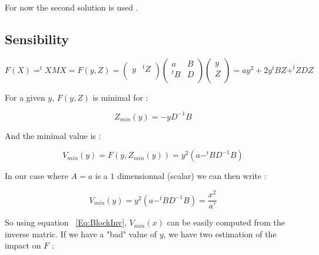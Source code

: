 For now the second solution is used .




\subsection{Sensibility}


\begin{equation}
F(X) = ^t X M X = F(y,Z)= 
\left( \begin{array}{cc} 
              y &  ^t Z \\ 
        \end{array} 
\right)
\left( \begin{array}{cc} 
              a & B \\ 
              ^t B  & D\\ 
        \end{array} 
\right)
\left( \begin{array}{c} 
              y \\ 
              Z \\ 
        \end{array} 
\right)
= a y^2 + 2y^t B Z + ^t Z D Z
\label{EqSensib1}
\end{equation}

For a given $y$, $F(y,Z)$ is minimal for :

\begin{equation}
Z_{min}(y) = -y  D^{-1} B
\end{equation}

And the minimal value is :

\begin{equation}
V_{min}(y) = F(y,Z_{min}(y)) =  y^2 (a- ^t B D^{-1} B)
\end{equation}


In our  case where $A=a$ is a $1$ dimensionnal (scalar) we can then write :

\begin{equation}
V_{min}(y) =   y^2 (a- ^t B D^{-1} B) = \frac{x^2}{a'}
\end{equation}

So using equation ~\ref{Eq:BlockInv}, $V_{min}(x)$ can be easily computed  from the inverse matric. If
we have a "bad" value of $y$, we have two estimation of the impact
on  $F$ :

